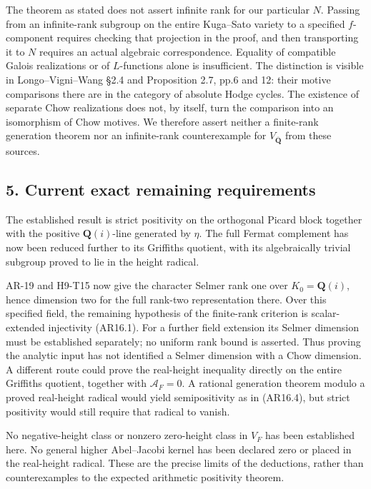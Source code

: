 \documentclass[11pt,a4paper]{article}
\begin{document}
The theorem as stated does not assert infinite rank for our particular
\(N\). Passing from an infinite-rank subgroup on the entire Kuga--Sato
variety to a specified \(f\)-component requires checking that projection
in the proof, and then transporting it to \(N\) requires an actual
algebraic correspondence. Equality of compatible Galois realizations or
of \(L\)-functions alone is insufficient. The distinction is visible in
Longo--Vigni--Wang §2.4 and Proposition 2.7, pp.6 and 12: their motive
comparisons there are in the category of absolute Hodge cycles. The
existence of separate Chow realizations does not, by itself, turn the
comparison into an isomorphism of Chow motives. We therefore assert
neither a finite-rank generation theorem nor an infinite-rank
counterexample for \(V_{\overline{\mathbf Q}}\) from these sources.

\subsection{5. Current exact remaining
requirements}\label{current-exact-remaining-requirements}

The established result is strict positivity on the orthogonal Picard
block together with the positive \(\mathbf Q(i)\)-line generated by
\(\eta\). The full Fermat complement has now been reduced further to its
Griffiths quotient, with its algebraically trivial subgroup proved to
lie in the height radical.

AR-19 and H9-T15 now give the character Selmer rank one over
\(K_0=\mathbf Q(i)\), hence dimension two for the full rank-two
representation there. Over this specified field, the remaining
hypothesis of the finite-rank criterion is scalar-extended injectivity
(AR16.1). For a further field extension its Selmer dimension must be
established separately; no uniform rank bound is asserted. Thus proving
the analytic input has not identified a Selmer dimension with a Chow
dimension. A different route could prove the real-height inequality
directly on the entire Griffiths quotient, together with
\(\mathcal A_F=0\). A rational generation theorem modulo a proved
real-height radical would yield semipositivity as in (AR16.4), but
strict positivity would still require that radical to vanish.

No negative-height class or nonzero zero-height class in \(V_F\) has
been established here. No general higher Abel--Jacobi kernel has been
declared zero or placed in the real-height radical. These are the
precise limits of the deductions, rather than counterexamples to the
expected arithmetic positivity theorem.
\end{document}
